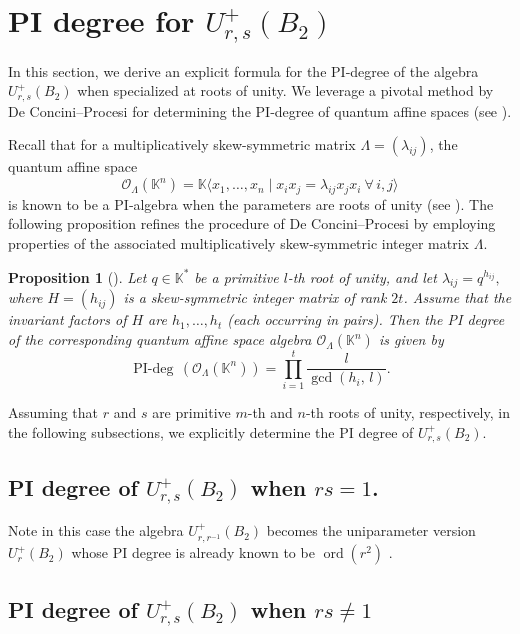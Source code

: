 \documentclass[12 pt,reqno]{amsart}
\numberwithin{equation}{section}
\DeclareMathOperator{\ord}{ord}
\DeclareMathOperator{\pideg}{PI-deg}
\newtheorem{prop}[thm]{Proposition}
\theoremstyle{definition}
\theoremstyle{definition}
\theoremstyle{remark}
\theoremstyle{remark}
\begin{document}
\section{\texorpdfstring{PI degree for $ U_{r,s}^+(B_2) $}{}}\label{secpideg}
In this section, we derive an explicit formula for the PI‑degree of the algebra $U_{r,s}^+(B_2)$ when specialized at roots of unity. We leverage  a pivotal method by De Concini–Procesi for determining the PI‑degree of quantum affine spaces (see \cite[Proposition 7.1]{di}).

Recall that for a multiplicatively skew-symmetric matrix \(\Lambda = (\lambda_{ij})\), the quantum affine space
\[
\mathcal{O}_{\Lambda}(\mathbb{K}^n)
= \mathbb{K}\bigl\langle x_1, \dots, x_n \mid x_i x_j = \lambda_{ij} x_j x_i\ \forall\,i,j \bigr\rangle
\]
is known to be a PI‑algebra when the parameters are roots of unity (see \cite[Proposition I.14.2]{brg}). The following proposition refines the procedure of De Concini–Procesi by employing properties of the associated multiplicatively skew‑symmetric integer matrix \(\Lambda\).


\begin{prop}[{\cite[Lemma~5.7]{ar}}]\label{mainpi}
Let \( q \in \mathbb{K}^* \) be a primitive \( l \)-th root of unity, and let 
$
\lambda_{ij} = q^{h_{ij}},
$
where \( H = (h_{ij}) \) is a skew-symmetric integer matrix of rank \( 2t \).  
Assume that the invariant factors of \( H \) are \( h_1, \ldots, h_t \) (each occurring in pairs).  
Then the PI degree of the corresponding quantum affine space algebra \(\mathcal{O}_{\Lambda}(\mathbb{K}^n)\) is given by
\[
\pideg\,\left(\mathcal{O}_{\Lambda}(\mathbb{K}^n)\right)
= \prod_{i=1}^{t} \frac{l}{\gcd(h_i,\, l)}.
\]
\end{prop}

Assuming that $r$ and $s$ are primitive $m$-th and $n$-th roots of unity, respectively, in the following subsections, we explicitly determine the PI degree of $U_{r,s}^+(B_2)$.
\subsection{\texorpdfstring{PI degree of $U_{r,s}^+(B_2)$ when $rs=1$.}{}} Note in this case the algebra $U_{r,r^{-1}}^+(B_2)$ becomes the uniparameter version $U_r^+(B_2)$ whose PI degree is already known to be $\ord(r^2)$ \cite[Theorem 2.7]{smsb}.


\subsection{\texorpdfstring{PI degree of \( U_{r,s}^+(B_2) \) when \( rs \neq 1 \)}{}}\label{Sub3.2}
\end{document}
